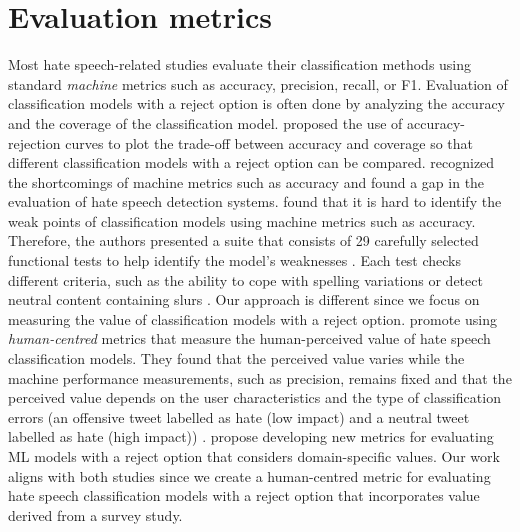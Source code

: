 \section{Evaluation metrics}
\label{sec:related-work-evaluation-metrics}
Most hate speech-related studies evaluate their classification methods using standard \textit{machine} metrics such as accuracy, precision, recall, or F1.
% 
Evaluation of classification models with a reject option is often done by analyzing the accuracy and the coverage of the classification model.
%
\citet{nadeem2009reject} proposed the use of accuracy-rejection curves to plot the trade-off between accuracy and coverage so that different classification models with a reject option can be compared.
%
\citet{rottger2020hatecheck, casati2021value, olteanu2017limits} recognized the shortcomings of machine metrics such as accuracy and found a gap in the evaluation of hate speech detection systems.
%
\citet{rottger2020hatecheck} found that it is hard to identify the weak points of classification models using machine metrics such as accuracy.
%
Therefore, the authors presented a suite that consists of 29 carefully selected functional tests to help identify the model's weaknesses \citep{rottger2020hatecheck}.
%
Each test checks different criteria, such as the ability to cope with spelling variations or detect neutral content containing slurs \citep{rottger2020hatecheck}.
%
Our approach is different since we focus on measuring the value of classification models with a reject option.
%
\citet{olteanu2017limits} promote using \textit{human-centred} metrics that measure the human-perceived value of hate speech classification models.
%
They found that the perceived value varies while the machine performance measurements, such as precision, remains fixed and that the perceived value depends on the user characteristics and the type of classification errors (an offensive tweet labelled as hate (low impact) and a neutral tweet labelled as hate (high impact)) \citep{olteanu2017limits}.
%
\citet{casati2021value} propose developing new metrics for evaluating ML models with a reject option that considers domain-specific values.
%
Our work aligns with both studies since we create a human-centred metric for evaluating hate speech classification models with a reject option that incorporates value derived from a survey study.